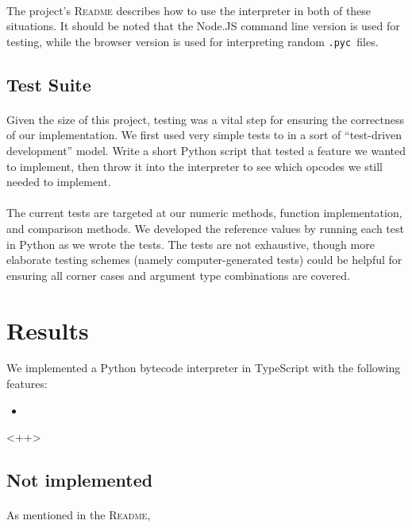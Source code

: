 \documentclass{article}
\newcommand{\pyc}{\texttt{.pyc~}}
\begin{document}
\paragraph{}
The project's \textsc{Readme} describes how to use the interpreter in both of these situations. It should be noted that the Node.JS command line version is used for testing, while the browser version is used for interpreting random \pyc files.

\subsection{Test Suite}

\paragraph{}
Given the size of this project, testing was a vital step for ensuring the correctness of our implementation. We first used very simple tests to in a sort of ``test-driven development'' model. Write a short Python script that tested a feature we wanted to implement, then throw it into the interpreter to see which opcodes we still needed to implement.

\paragraph{}
The current tests are targeted at our numeric methods, function implementation, and comparison methods. We developed the reference values by running each test in Python as we wrote the tests. The tests are not exhaustive, though more elaborate testing schemes (namely computer-generated tests) could be helpful for ensuring all corner cases and argument type combinations are covered.

\section{Results}\label{results}

We implemented a Python bytecode interpreter in TypeScript with the following features:

\begin{itemize}
  \item 
\end{itemize}<++>

\subsection{Not implemented}

\paragraph{}
As mentioned in the \textsc{Readme},


%
%

\end{document}
